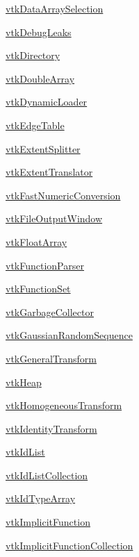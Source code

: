 \begin{DoxyItemize}
\item \hyperlink{vtkcommon_vtkdataarrayselection}{vtk\-Data\-Array\-Selection}  
\item \hyperlink{vtkcommon_vtkdebugleaks}{vtk\-Debug\-Leaks}  
\item \hyperlink{vtkcommon_vtkdirectory}{vtk\-Directory}  
\item \hyperlink{vtkcommon_vtkdoublearray}{vtk\-Double\-Array}  
\item \hyperlink{vtkcommon_vtkdynamicloader}{vtk\-Dynamic\-Loader}  
\item \hyperlink{vtkcommon_vtkedgetable}{vtk\-Edge\-Table}  
\item \hyperlink{vtkcommon_vtkextentsplitter}{vtk\-Extent\-Splitter}  
\item \hyperlink{vtkcommon_vtkextenttranslator}{vtk\-Extent\-Translator}  
\item \hyperlink{vtkcommon_vtkfastnumericconversion}{vtk\-Fast\-Numeric\-Conversion}  
\item \hyperlink{vtkcommon_vtkfileoutputwindow}{vtk\-File\-Output\-Window}  
\item \hyperlink{vtkcommon_vtkfloatarray}{vtk\-Float\-Array}  
\item \hyperlink{vtkcommon_vtkfunctionparser}{vtk\-Function\-Parser}  
\item \hyperlink{vtkcommon_vtkfunctionset}{vtk\-Function\-Set}  
\item \hyperlink{vtkcommon_vtkgarbagecollector}{vtk\-Garbage\-Collector}  
\item \hyperlink{vtkcommon_vtkgaussianrandomsequence}{vtk\-Gaussian\-Random\-Sequence}  
\item \hyperlink{vtkcommon_vtkgeneraltransform}{vtk\-General\-Transform}  
\item \hyperlink{vtkcommon_vtkheap}{vtk\-Heap}  
\item \hyperlink{vtkcommon_vtkhomogeneoustransform}{vtk\-Homogeneous\-Transform}  
\item \hyperlink{vtkcommon_vtkidentitytransform}{vtk\-Identity\-Transform}  
\item \hyperlink{vtkcommon_vtkidlist}{vtk\-Id\-List}  
\item \hyperlink{vtkcommon_vtkidlistcollection}{vtk\-Id\-List\-Collection}  
\item \hyperlink{vtkcommon_vtkidtypearray}{vtk\-Id\-Type\-Array}  
\item \hyperlink{vtkcommon_vtkimplicitfunction}{vtk\-Implicit\-Function}  
\item \hyperlink{vtkcommon_vtkimplicitfunctioncollection}{vtk\-Implicit\-Function\-Collection}  

\end{DoxyItemize}
